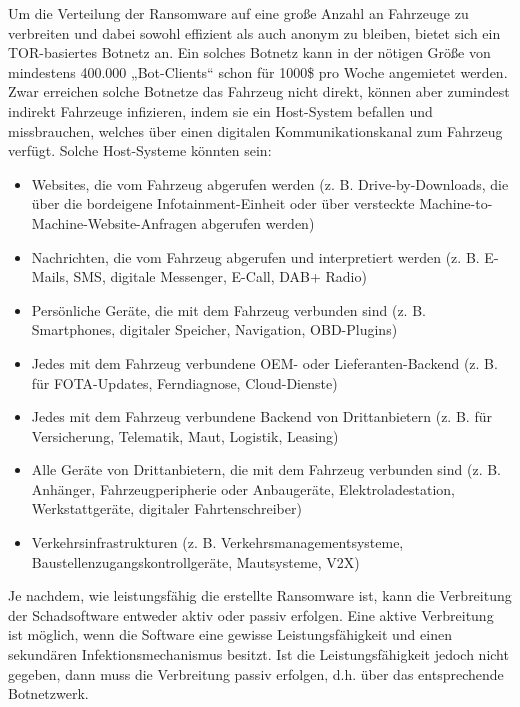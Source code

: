 Um die Verteilung der Ransomware auf eine große Anzahl an Fahrzeuge zu verbreiten 
und dabei sowohl effizient als auch anonym zu bleiben, bietet sich ein TOR-basiertes 
Botnetz an. Ein solches Botnetz kann in der nötigen Größe von mindestens 400.000 
„Bot-Clients“ schon für 1000\$ pro Woche angemietet werden. 
\newline
Zwar erreichen solche Botnetze das Fahrzeug nicht direkt, können aber zumindest 
indirekt Fahrzeuge infizieren, indem sie ein Host-System befallen und missbrauchen, 
welches über einen digitalen Kommunikationskanal zum Fahrzeug verfügt. Solche Host-Systeme 
könnten sein:

\begin{itemize}
    \item Websites, die vom Fahrzeug abgerufen werden (z. B. Drive-by-Downloads, die über 
    die bordeigene Infotainment-Einheit oder über versteckte Machine-to-Machine-Website-Anfragen 
    abgerufen werden)
    \item Nachrichten, die vom Fahrzeug abgerufen und interpretiert werden (z. B. E-Mails, SMS, 
    digitale Messenger, E-Call, DAB+ Radio)
    \item Persönliche Geräte, die mit dem Fahrzeug verbunden sind (z. B. Smartphones, digitaler 
    Speicher, Navigation, OBD-Plugins)
    \item Jedes mit dem Fahrzeug verbundene OEM- oder Lieferanten-Backend (z. B. für FOTA-Updates, 
    Ferndiagnose, Cloud-Dienste)
    \item Jedes mit dem Fahrzeug verbundene Backend von Drittanbietern (z. B. für Versicherung, 
    Telematik, Maut, Logistik, Leasing)
    \item Alle Geräte von Drittanbietern, die mit dem Fahrzeug verbunden sind (z. B. Anhänger, 
    Fahrzeugperipherie oder Anbaugeräte, Elektroladestation, Werkstattgeräte, digitaler 
    Fahrtenschreiber)
    \item Verkehrsinfrastrukturen (z. B. Verkehrsmanagementsysteme, Baustellenzugangskontrollgeräte, 
    Mautsysteme, V2X)
\end{itemize}
	
Je nachdem, wie leistungsfähig die erstellte Ransomware ist, kann die Verbreitung der 
Schadsoftware entweder aktiv oder passiv erfolgen. Eine aktive Verbreitung ist möglich, 
wenn die Software eine gewisse Leistungsfähigkeit und einen sekundären Infektionsmechanismus 
besitzt. Ist die Leistungsfähigkeit jedoch nicht gegeben, dann muss die Verbreitung passiv 
erfolgen, d.h. über das entsprechende Botnetzwerk.   
